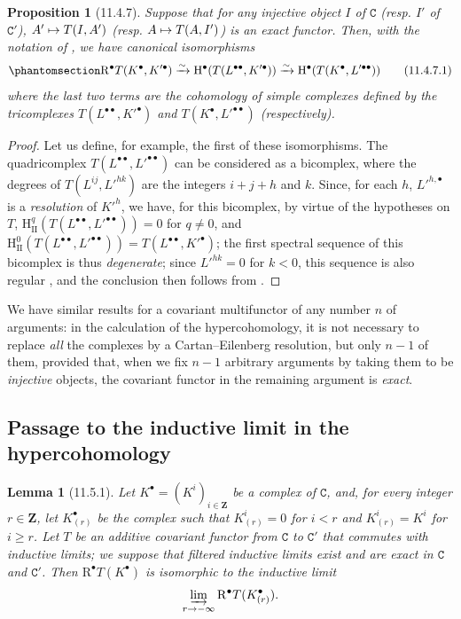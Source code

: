 \documentclass[oneside]{amsart}
\theoremstyle{ega-env-style}
\theoremstyle{ega-thm-env-style}
\newtheorem*{proposition}{Proposition}
\newtheorem*{lemma}{Lemma}
\theoremstyle{ega-defn-env-style}
\def\bb{\mathbf}                    %
\def\cat{\mathtt}                   %
\def\geq{\geqslant}                 %
\def\HH{\mathrm{H}}                 %
\def\RR{\mathrm{R}}                 %
\renewcommand{\to}{\mathchoice{\longrightarrow}{\rightarrow}{\rightarrow}{\rightarrow}}
\let\mapstoo\mapsto
\renewcommand{\mapsto}{\mathchoice{\longmapsto}{\mapstoo}{\mapstoo}{\mapstoo}}
\def\simto{\xrightarrow{\sim}}
\newcommand{\oldpage}[2][]{{\marginnote{\normalfont{\textbf{#1}~|~#2}}}\ignorespaces}
\let\EGAOriginalLabel\label
\renewcommand{\label}[1]{\phantomsection\EGAOriginalLabel{#1}}
\begin{document}
\begin{proposition}[11.4.7]
\label{0.11.4.7}
Suppose that for any injective object $I$ of $\cat{C}$ (resp. $I'$ of $\cat{C}'$), $A'\mapsto T(I, A')$ (resp. $A\mapsto T(A, I')$) is an exact functor.
Then, with the notation of , we have canonical isomorphisms
\[
  \label{0.11.4.7.1} \RR^\bullet T(K^\bullet, K'^\bullet) \simto \HH^\bullet(T(L^{\bullet\bullet}, K'^\bullet)) \simto \HH^\bullet(T(K^\bullet, L'^{\bullet\bullet})) \tag{11.4.7.1} 
\]
where the last two terms are the cohomology of simple complexes defined by the tricomplexes $T(L^{\bullet\bullet}, K'^\bullet)$ and $T(K^\bullet, L'^{\bullet\bullet})$ (respectively).
\end{proposition}

\begin{proof}
Let us define, for example, the first of these isomorphisms.
The quadricomplex $T(L^{\bullet\bullet}, L'^{\bullet\bullet})$ can be considered as a bicomplex, where the degrees of $T(L^{ij}, L'^{hk})$ are the integers $i+j+h$ and $k$.
Since, for each $h$, ${L'}^{h,\bullet}$ is a \emph{resolution} of ${K'}^h$, we have, for this bicomplex, by virtue of the hypotheses on $T$, $\HH_\mathrm{II}^q(T(L^{\bullet\bullet}, L'^{\bullet\bullet}))=0$ for $q\neq 0$, and $\HH_\mathrm{II}^0(T(L^{\bullet\bullet}, L'^{\bullet\bullet})) = T(L^{\bullet\bullet}, K'^\bullet)$;
the first spectral sequence of this bicomplex is thus \emph{degenerate};
since $L'^{hk}=0$ for $k<0$, this sequence is also regular , and the conclusion then follows from .
\end{proof}

We have similar results for a covariant multifunctor of any number $n$ of arguments: in the calculation of the hypercohomology, it is not necessary to replace \emph{all} the complexes 
by a Cartan--Eilenberg resolution, but only $n-1$ of them, provided that, when we fix $n-1$ arbitrary arguments by taking them to be \emph{injective} objects, the covariant functor in the remaining argument is \emph{exact}.


\subsection{Passage to the inductive limit in the hypercohomology}
\label{subsection:0.11.5}

\begin{lemma}[11.5.1]
\label{0.11.5.1}
Let $K^\bullet=(K^i)_{i\in\bb{Z}}$ be a complex of $\cat{C}$, and, for every integer $r\in\bb{Z}$, let $K^\bullet_{(r)}$ be the complex such that $K^i_{(r)}=0$ for $i<r$ and $K^i_{(r)}=K^i$ for $i\geq r$.
Let $T$ be an additive covariant functor
\oldpage[0\textsubscript{III}]{36}
from $\cat{C}$ to $\cat{C}'$ that commutes with inductive limits; we suppose that filtered inductive limits exist and are exact in $\cat{C}$ and $\cat{C}'$.
Then $\RR^\bullet T(K^\bullet)$ is isomorphic to the inductive limit
\[
  \varinjlim_{r\to-\infty}\RR^\bullet T(K^\bullet_{(r)}).
\]
\end{lemma}
\end{document}
